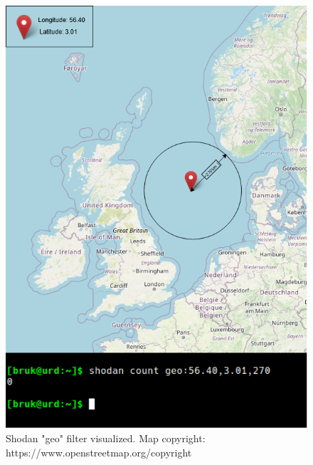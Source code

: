 \begin{figure}
    \centering

    \includegraphics[scale=0.7]{Figurer/geolocation.png}
    \caption{Shodan "geo" filter visualized. Map copyright: https://www.openstreetmap.org/copyright}
    \label{fig:api_doc}
\end{figure}